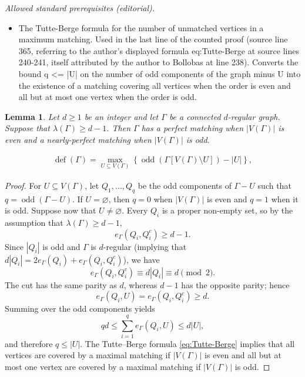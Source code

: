 \documentclass[10pt,a4paper]{amsart}
\newtheorem{lemma}[thm]{Lemma}
\newcommand{\defi}{\operatorname{def}}
\newcommand{\odd}{\operatorname{odd}}
\begin{document}
\noindent\textit{Allowed standard prerequisites (editorial).}\begin{itemize}
\item The Tutte-Berge formula for the number of unmatched vertices in a maximum matching. Used in the last line of the counted proof (source line 365, referring to the author's displayed formula eq:Tutte-Berge at source lines 240-241, itself attributed by the author to Bollobas at line 238). Converts the bound q <= |U| on the number of odd components of the graph minus U into the existence of a matching covering all vertices when the order is even and all but at most one vertex when the order is odd.
\end{itemize}\medskip
\begin{lemma}\label{lem:regular-matching}
Let $d \geq 1$ be an integer and let $\Gamma$ be a connected $d$-regular graph. Suppose that $\lambda(\Gamma)\ge d-1$.
Then $\Gamma$ has a perfect matching when $|V(\Gamma)|$ is even and a nearly-perfect matching when $|V(\Gamma)|$ is odd.
\end{lemma}

\begin{align} \label{eq:Tutte-Berge}
    \defi(\Gamma)= \max_{U\subseteq V(\Gamma)} \left\{\odd\left(\Gamma[V(\Gamma)\setminus U]\right)- |U|\right\},
\end{align}

\begin{proof}
For $U\subseteq V(\Gamma)$, let $Q_1,\ldots,Q_q$ be the odd components of $\Gamma-U$ such that $q=\odd(\Gamma - U)$.
If $U=\varnothing$, then $q=0$ when $|V(\Gamma)|$ is even and $q=1$ when it is odd.
Suppose now that $U\ne\varnothing$.
Every $Q_i$ is a proper non-empty set, so by the assumption that $\lambda(\Gamma)\geq d-1$,
\[
  e_\Gamma(Q_i,Q_i^c)\ge d-1.
\]
Since $|Q_i|$ is odd and $\Gamma$ is $d$-regular (implying that $d|Q_i|= 2 e_{\Gamma}(Q_i) + e_{\Gamma}(Q_i, Q_i^c)$), we have
\[
  e_\Gamma(Q_i,Q_i^c)\equiv d|Q_i|\equiv d\pmod 2.
\]
The cut has the same parity as $d$, whereas $d-1$ has the opposite parity; hence
\[
  e_\Gamma(Q_i,U)=e_\Gamma(Q_i,Q_i^c)\ge d.
\]
Summing over the odd components yields
\[
  qd\le\sum_{i=1}^q e_\Gamma(Q_i,U)\le d|U|,
\]
and therefore $q\le|U|$.
The Tutte--Berge formula \eqref{eq:Tutte-Berge} implies that all vertices are covered by a maximal matching if $|V(\Gamma)|$ is even and all but at most one vertex are covered by a maximal matching if $|V(\Gamma)|$ is odd.
\end{proof}
\end{document}
